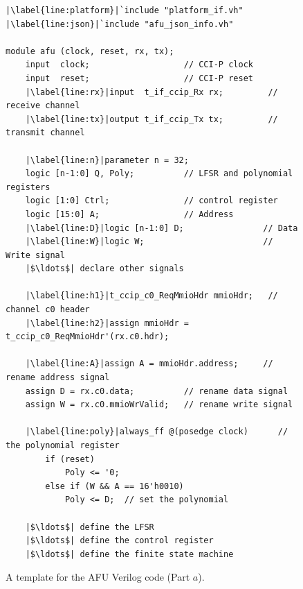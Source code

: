 \documentclass[epsfig,10pt,fullpage]{article}
\begin{document}
\begin{figure}[H]
\begin{center}
\begin{minipage}[h]{15 cm}
\begin{lstlisting}[name=AFU]
|\label{line:platform}|`include "platform_if.vh"
|\label{line:json}|`include "afu_json_info.vh"

module afu (clock, reset, rx, tx);
    input  clock;                   // CCI-P clock
    input  reset;                   // CCI-P reset
    |\label{line:rx}|input  t_if_ccip_Rx rx;         // receive channel
    |\label{line:tx}|output t_if_ccip_Tx tx;         // transmit channel

    |\label{line:n}|parameter n = 32;
    logic [n-1:0] Q, Poly;          // LFSR and polynomial registers
    logic [1:0] Ctrl;               // control register
    logic [15:0] A;                 // Address
    |\label{line:D}|logic [n-1:0] D;                // Data
    |\label{line:W}|logic W;                        // Write signal
    |$\ldots$| declare other signals

    |\label{line:h1}|t_ccip_c0_ReqMmioHdr mmioHdr;   // channel c0 header
    |\label{line:h2}|assign mmioHdr = t_ccip_c0_ReqMmioHdr'(rx.c0.hdr);

    |\label{line:A}|assign A = mmioHdr.address;     // rename address signal
    assign D = rx.c0.data;          // rename data signal
    assign W = rx.c0.mmioWrValid;   // rename write signal

    |\label{line:poly}|always_ff @(posedge clock)      // the polynomial register
        if (reset)
            Poly <= '0;
        else if (W && A == 16'h0010)
            Poly <= D;  // set the polynomial

    |$\ldots$| define the LFSR
    |$\ldots$| define the control register
    |$\ldots$| define the finite state machine
\end{lstlisting}
\end{minipage}
\caption{A template for the AFU Verilog code (Part $a$).}
\label{fig:AFU_code}
\end{center}
\end{figure}
\end{document}
